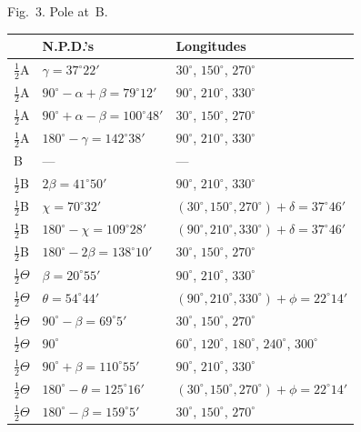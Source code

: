 \documentclass[11pt,a4paper]{book}
\begin{document}
\begin{art}
Fig.~3. Pole at~B.

\begin{center}
\begin{tabular}{|l|l|l|}
\hline
& N.P.D.'s & Longitudes \\
\hline
$\frac{1}{2}$A & $\gamma = 37^\circ 22'$ & $30^\circ$, $150^\circ$, $270^\circ$ \\
$\frac{1}{2}$A & $90^\circ - \alpha + \beta = 79^\circ 12'$ & $90^\circ$, $210^\circ$, $330^\circ$ \\
$\frac{1}{2}$A & $90^\circ + \alpha - \beta = 100^\circ 48'$ & $30^\circ$, $150^\circ$, $270^\circ$ \\
$\frac{1}{2}$A & $180^\circ - \gamma = 142^\circ 38'$ & $90^\circ$, $210^\circ$, $330^\circ$ \\
\hline
B & --- & --- \\
\hline
$\frac{1}{2}$B & $2\beta = 41^\circ 50'$ & $90^\circ$, $210^\circ$, $330^\circ$ \\
$\frac{1}{2}$B & $\chi = 70^\circ 32'$ & $(30^\circ, 150^\circ, 270^\circ) + \delta = 37^\circ 46'$ \\
$\frac{1}{2}$B & $180^\circ - \chi = 109^\circ 28'$ & $(90^\circ, 210^\circ, 330^\circ) + \delta = 37^\circ 46'$ \\
$\frac{1}{2}$B & $180^\circ - 2\beta = 138^\circ 10'$ & $30^\circ$, $150^\circ$, $270^\circ$ \\
\hline
$\frac{1}{2}\Theta$ & $\beta = 20^\circ 55'$ & $90^\circ$, $210^\circ$, $330^\circ$ \\
$\frac{1}{2}\Theta$ & $\theta = 54^\circ 44'$ & $(90^\circ, 210^\circ, 330^\circ) + \phi = 22^\circ 14'$ \\
$\frac{1}{2}\Theta$ & $90^\circ - \beta = 69^\circ 5'$ & $30^\circ$, $150^\circ$, $270^\circ$ \\
$\frac{1}{2}\Theta$ & $90^\circ$ & $60^\circ$, $120^\circ$, $180^\circ$, $240^\circ$, $300^\circ$ \\
$\frac{1}{2}\Theta$ & $90^\circ + \beta = 110^\circ 55'$ & $90^\circ$, $210^\circ$, $330^\circ$ \\
$\frac{1}{2}\Theta$ & $180^\circ - \theta = 125^\circ 16'$ & $(30^\circ, 150^\circ, 270^\circ) + \phi = 22^\circ 14'$ \\
$\frac{1}{2}\Theta$ & $180^\circ - \beta = 159^\circ 5'$ & $30^\circ$, $150^\circ$, $270^\circ$ \\
\hline
\end{tabular}
\end{center}
\end{art}
\end{document}
